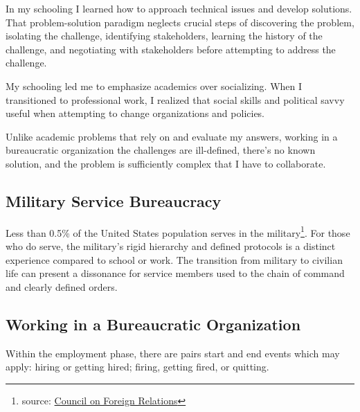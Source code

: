
In my schooling I learned how to approach technical issues and develop solutions. That problem-solution paradigm neglects crucial steps of discovering the problem, isolating the challenge, identifying stakeholders, learning the history of the challenge, and negotiating with stakeholders before attempting to address the challenge. 

My schooling led me to emphasize academics over socializing. When I transitioned to professional work, I realized that social skills and political savvy useful when attempting to change organizations and policies. 

Unlike academic problems that rely on and evaluate my answers, working in a bureaucratic organization the challenges are ill-defined, there's no known solution, and the problem is sufficiently complex that I have to collaborate.







\subsection*{Military Service Bureaucracy\label{bureaucracy-of-military}}
Less than 0.5\% of the United States population serves in the military\footnote{source: \href{https://www.cfr.org/backgrounder/demographics-us-military}{Council on Foreign Relations}}. For those who do serve, the military's rigid hierarchy and defined protocols is a distinct experience compared to school or work. The transition from military to civilian life can present a dissonance for service members used to the chain of command and clearly defined orders. 

\subsection*{Working in a Bureaucratic Organization\label{sec:bureaucracy-of-work}}
Within the employment phase, there are pairs start and end events which may apply: hiring or getting hired; firing, getting fired, or quitting. 

